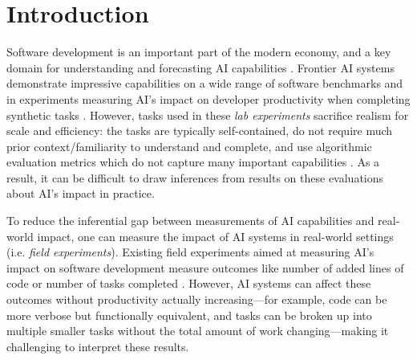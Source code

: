 \documentclass{article}
\begin{document}

\renewcommand{\thefootnote}{\arabic{footnote}}


\section{Introduction}
\label{sec:introduction}

Software development is an important part of the modern economy, and a key domain for understanding and forecasting AI capabilities \cite{maslej2025aiindex, kwa2025measuringai}. Frontier AI systems demonstrate impressive capabilities on a wide range of software benchmarks \cite{wijk2025rebenchevaluatingfrontierai, chan2025mlebenchevaluatingmachinelearning, starace2025paperbenchevaluatingaisability, quan2025codeelobenchmarkingcompetitionlevelcode, miserendino2025swe, rein2023, rein2025hcasthumancalibratedautonomysoftware} and in experiments measuring AI's impact on developer productivity when completing synthetic tasks \cite{peng2023impactaideveloperproductivity, paradis2024doesaiimpactdevelopment}. However, tasks used in these \textit{lab experiments} sacrifice realism for scale and efficiency: the tasks are typically self-contained, do not require much prior context/familiarity to understand and complete, and use algorithmic evaluation metrics which do not capture many important capabilities \cite{raji2021everythinginthewholewideworldbenchmark, biderman2024lessonstrenchesreproducibleevaluation, davis2023benchmarksautomatedcommonsensereasoning}. As a result, it can be difficult to draw inferences from results on these evaluations about AI's impact in practice.

To reduce the inferential gap between measurements of AI capabilities and real-world impact, one can measure the impact of AI systems in real-world settings (i.e. \textit{field experiments}). Existing field experiments aimed at measuring AI's impact on software development measure outcomes like number of added lines of code or number of tasks completed \cite{gambacorta2024generative,yeverechyahu2025impactllmopensource,cui2025effectsgenerativeai}. However, AI systems can affect these outcomes without productivity actually increasing---for example, code can be more verbose but functionally equivalent, and tasks can be broken up into multiple smaller tasks without the total amount of work changing---making it challenging to interpret these results.
\end{document}
